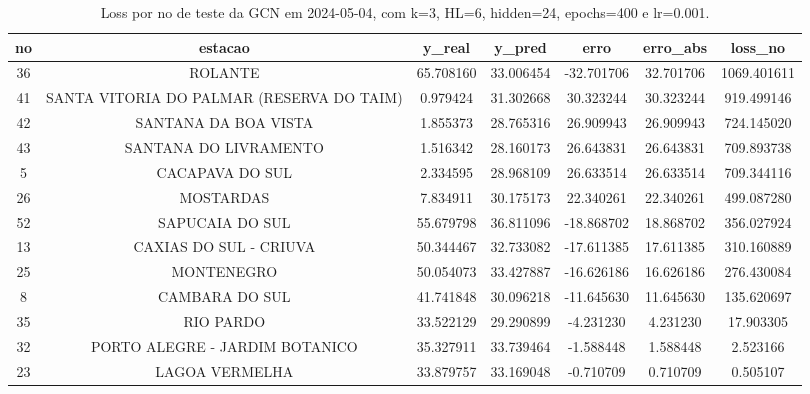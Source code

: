 \begin{table}[h]
\centering
\caption{Loss por no de teste da GCN em 2024-05-04, com k=3, HL=6, hidden=24, epochs=400 e lr=0.001.}
\label{tab:gcn_loss_k3_hl6_h24_e400_d20240504}
\begin{tabular}{ccccccc}
\toprule
no & estacao & y\_real & y\_pred & erro & erro\_abs & loss\_no \\
\midrule
36 & ROLANTE & 65.708160 & 33.006454 & -32.701706 & 32.701706 & 1069.401611 \\
41 & SANTA VITORIA DO PALMAR (RESERVA DO TAIM) & 0.979424 & 31.302668 & 30.323244 & 30.323244 & 919.499146 \\
42 & SANTANA DA BOA VISTA & 1.855373 & 28.765316 & 26.909943 & 26.909943 & 724.145020 \\
43 & SANTANA DO LIVRAMENTO & 1.516342 & 28.160173 & 26.643831 & 26.643831 & 709.893738 \\
5 & CACAPAVA DO SUL & 2.334595 & 28.968109 & 26.633514 & 26.633514 & 709.344116 \\
26 & MOSTARDAS & 7.834911 & 30.175173 & 22.340261 & 22.340261 & 499.087280 \\
52 & SAPUCAIA DO SUL & 55.679798 & 36.811096 & -18.868702 & 18.868702 & 356.027924 \\
13 & CAXIAS DO SUL - CRIUVA & 50.344467 & 32.733082 & -17.611385 & 17.611385 & 310.160889 \\
25 & MONTENEGRO & 50.054073 & 33.427887 & -16.626186 & 16.626186 & 276.430084 \\
8 & CAMBARA DO SUL & 41.741848 & 30.096218 & -11.645630 & 11.645630 & 135.620697 \\
35 & RIO PARDO & 33.522129 & 29.290899 & -4.231230 & 4.231230 & 17.903305 \\
32 & PORTO ALEGRE - JARDIM BOTANICO & 35.327911 & 33.739464 & -1.588448 & 1.588448 & 2.523166 \\
23 & LAGOA VERMELHA & 33.879757 & 33.169048 & -0.710709 & 0.710709 & 0.505107 \\
\bottomrule
\end{tabular}
\end{table}

